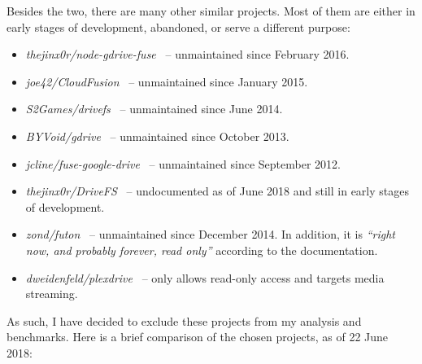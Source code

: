 Besides the two, there are many other similar projects. Most of them are either in early stages of development, abandoned, or serve a different purpose:

\begin{itemize}
  \itemsep0em
  \item \emph{thejinx0r/node-gdrive-fuse}~\cite{thejinx0r/node-gdrive-fuse} -- unmaintained since February 2016.
  \item \emph{joe42/CloudFusion}~\cite{joe42/CloudFusion} -- unmaintained since January 2015.
  \item \emph{S2Games/drivefs}~\cite{S2Games/drivefs} -- unmaintained since June 2014.
  \item \emph{BYVoid/gdrive}~\cite{BYVoid/gdrive} -- unmaintained since October 2013.
  \item \emph{jcline/fuse-google-drive}~\cite{jcline/fuse-google-drive} -- unmaintained since September 2012.
  \item \emph{thejinx0r/DriveFS}~\cite{thejinx0r/DriveFS} -- undocumented as of June 2018 and still in early stages of development.
  \item \emph{zond/futon}~\cite{zond/futon} -- unmaintained since December 2014. In addition, it is \emph{``right now, and probably forever, read only''} according to the documentation.
  \item \emph{dweidenfeld/plexdrive}~\cite{dweidenfeld/plexdrive} -- only allows read-only access and targets media streaming.
\end{itemize}

As such, I have decided to exclude these projects from my analysis and benchmarks. Here is a brief comparison of the chosen projects, as of 22 June 2018:

\vspace{1em}

